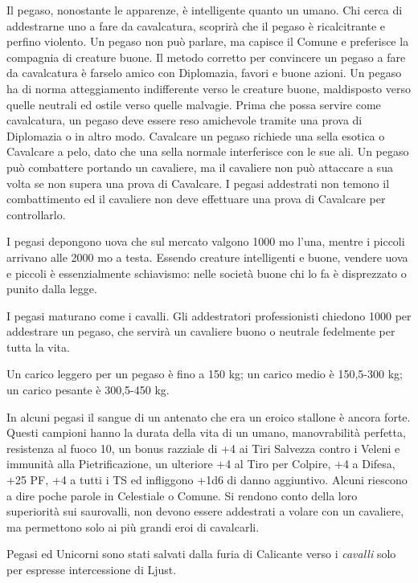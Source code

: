 \begin{multicols}{2}
{Il pegaso, nonostante le apparenze, è intelligente quanto un umano. Chi cerca di addestrarne uno a fare da cavalcatura, scoprirà che il pegaso è ricalcitrante e perfino violento. Un pegaso non può parlare, ma capisce il Comune e preferisce la compagnia di creature buone. Il metodo corretto per convincere un pegaso a fare da cavalcatura è farselo amico con Diplomazia, favori e buone azioni. Un pegaso ha di norma atteggiamento indifferente verso le creature buone, maldisposto verso quelle neutrali ed ostile verso quelle malvagie. Prima che possa servire come cavalcatura, un pegaso deve essere reso amichevole tramite una prova di Diplomazia o in altro modo. Cavalcare un pegaso richiede una sella esotica o Cavalcare a pelo, dato che una sella normale interferisce con le sue ali. Un pegaso può combattere portando un cavaliere, ma il cavaliere non può attaccare a sua volta se non supera una prova di Cavalcare. I pegasi addestrati non temono il combattimento ed il cavaliere non deve effettuare una prova di Cavalcare per controllarlo.

I pegasi depongono uova che sul mercato valgono 1000 mo l'una, mentre i piccoli arrivano alle 2000 mo a testa. Essendo creature intelligenti e buone, vendere uova e piccoli è essenzialmente schiavismo: nelle società buone chi lo fa è disprezzato o punito dalla legge.

I pegasi maturano come i cavalli. Gli addestratori professionisti chiedono 1000 per addestrare un pegaso, che servirà un cavaliere buono o neutrale fedelmente per tutta la vita.

Un carico leggero per un pegaso è fino a 150 kg; un carico medio è 150,5-300 kg; un carico pesante è 300,5-450 kg.

In alcuni pegasi il sangue di un antenato che era un eroico stallone è ancora forte. Questi campioni hanno la durata della vita di un umano, manovrabilità perfetta, resistenza al fuoco 10, un bonus razziale di +4 ai Tiri Salvezza contro i Veleni e immunità alla Pietrificazione, un ulteriore +4 al Tiro per Colpire, +4 a Difesa, +25 PF, +4 a tutti i TS ed infliggono +1d6 di danno aggiuntivo. Alcuni riescono a dire poche parole in Celestiale o Comune. Si rendono conto della loro superiorità sui saurovalli, non devono essere addestrati a volare con un cavaliere, ma permettono solo ai più grandi eroi di cavalcarli.

Pegasi ed Unicorni sono stati salvati dalla furia di Calicante verso i \emph{cavalli} solo per espresse intercessione di Ljust.

}
\end{multicols}
